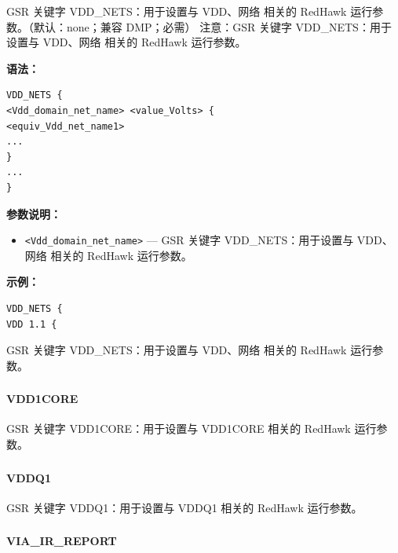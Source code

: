 GSR 关键字 VDD_NETS：用于设置与 VDD、网络 相关的 RedHawk 运行参数。（默认：none；兼容 DMP；必需） 注意：GSR 关键字 VDD_NETS：用于设置与 VDD、网络 相关的 RedHawk 运行参数。

\textbf{语法：}
\begin{lstlisting}
VDD_NETS {
<Vdd_domain_net_name> <value_Volts> {
<equiv_Vdd_net_name1>
...
}
...
}
\end{lstlisting}

\textbf{参数说明：}
\begin{itemize}
\item \texttt{<Vdd\_domain\_net\_name>} — GSR 关键字 VDD\_NETS：用于设置与 VDD、网络 相关的 RedHawk 运行参数。
\end{itemize}

\textbf{示例：}
\begin{lstlisting}
VDD_NETS {
VDD 1.1 {
\end{lstlisting}

\begin{noteBox}
GSR 关键字 VDD\_NETS：用于设置与 VDD、网络 相关的 RedHawk 运行参数。
\end{noteBox}

\subsubsection{}
\paragraph*{VDD1CORE}

GSR 关键字 VDD1CORE：用于设置与 VDD1CORE 相关的 RedHawk 运行参数。

\subsubsection{}
\paragraph*{VDDQ1}

GSR 关键字 VDDQ1：用于设置与 VDDQ1 相关的 RedHawk 运行参数。

\subsubsection{}
\paragraph*{VIA_IR_REPORT}

